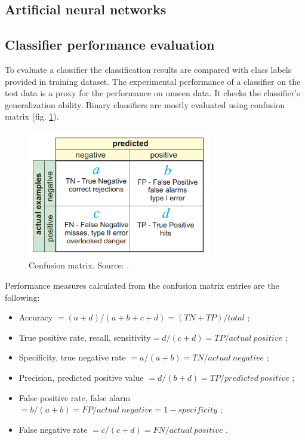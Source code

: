 \subsection{Artificial neural networks}

\subsection{Classifier performance evaluation}

To evaluate a classifier the classification results are compared with class labels provided in training dataset. The experimental performance of a classifier on the test data is a proxy for the performance on unseen data. It checks the classifier’s generalization ability.
Binary classifiers are mostly evaluated using confusion matrix (fig. \ref{fig:confusion-matrix}).

\begin{figure}[h]
    \centering
    \includegraphics[width=8cm]{Images/Confusion-matrix.png}
    \caption{Confusion matrix. Source: \citep{kohavi:glossary}.}
    \label{fig:confusion-matrix}
\end{figure}

Performance measures calculated from the confusion matrix entries are the following:
\begin{itemize}
    \item Accuracy $= (a + d)/(a + b + c + d) =
    (TN + TP)/total$ ;
    \item True positive rate, recall, sensitivity$ =
    d/(c + d) = TP/actual\: positive$ ;
    \item Specificity, true negative rate $= a/(a + b) =
    TN/actual\: negative$ ; 
    \item Precision, predicted positive value $=
    d/(b + d) = TP/predicted\: positive$ ;
    \item False positive rate, false alarm $= b/(a + b)
    = FP/actual\: negative = 1 - specificity$ ;
    \item False negative rate $= c/(c + d) = FN/actual\: positive$ .
\end{itemize}

